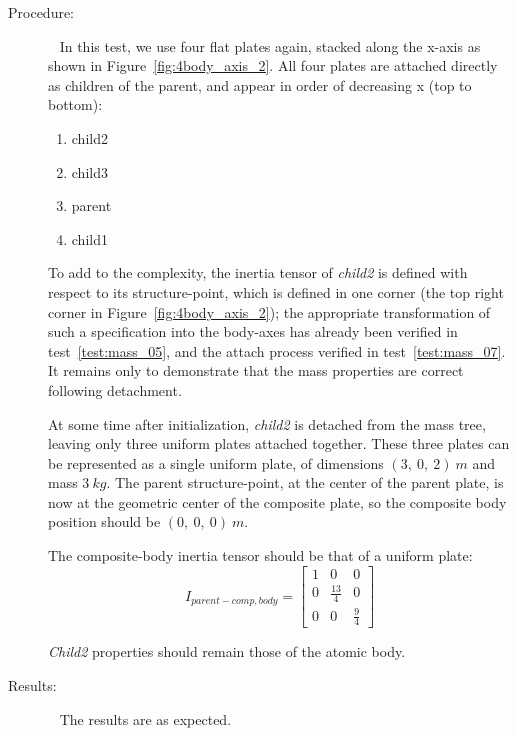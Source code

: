\begin{description}
\item[Procedure:]\ \newline
In this test, we use four flat plates again, stacked along the x-axis as shown 
in Figure~\ref{fig:4body_axis_2}.  All four plates are attached directly as 
children of the parent, and appear in order of decreasing x (top to bottom):
\begin{enumerate}
 \item child2
 \item child3
 \item parent
 \item child1
\end{enumerate}

To add to the complexity, the inertia tensor of \textit{child2} is defined 
with respect to its structure-point, which is defined in one corner (the top 
right corner in Figure~\ref{fig:4body_axis_2}); the appropriate transformation 
of such a specification into the body-axes has already been verified in 
test~\ref{test:mass_05}, and the attach process verified in 
test~\ref{test:mass_07}.  It remains only to demonstrate that the mass 
properties are correct following detachment.

At some time after initialization, \textit{child2} is detached from the mass 
tree, leaving only three uniform plates attached together. These three plates 
can be represented as a single uniform plate, of dimensions $(3,~0,~2)~m$ and 
mass $3~kg$.  The parent structure-point, at the center of the parent plate, 
is now at the geometric center of the composite plate, so the composite body 
position should be $(0,~0,~0)~m$.

The composite-body inertia tensor should be that of a uniform plate:
\begin{equation*}
I_{parent-comp,body} = 
   \begin{bmatrix} 1 & 0   & 0  \\
                   0   & \frac{13}{4} & 0   \\
                    0  & 0   & \frac{9}{4} 
   \end{bmatrix}
\end{equation*} 

\textit{Child2} properties should remain those of the atomic body.

\item[Results:]\ \newline
The results are as expected.


\end{description}

